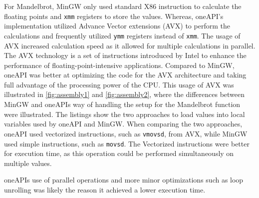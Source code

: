 For Mandelbrot, MinGW only used standard X86 instruction\cite{X86} to calculate the floating points and \texttt{xmm} registers to store the values. Whereas, oneAPI's implementation utilized Advance Vector extensions (AVX)\cite{AVXIntel} to perform the calculations and frequently utilized \texttt{ymm} registers instead of \texttt{xmm}. The usage of AVX increased calculation speed as it allowed for multiple calculations in parallel. The AVX technology is a set of instructions introduced by Intel to enhance the performance of floating-point-intensive applications\cite{AVXIntel}. Compared to MinGW, oneAPI was better at optimizing the code for the AVX architecture and taking full advantage of the processing power of the CPU. This usage of AVX was illustrated in \cref{fig:assembly1} and \cref{fig:assembly2}, where the differences between MinGW and oneAPIs way of handling the setup for the Mandelbrot function were illustrated. The listings show the two approaches to load values into local variables used by oneAPI and MinGW. When comparing the two approaches, oneAPI used vectorized instructions, such as \texttt{vmovsd}, from AVX, while MinGW used simple instructions, such as \texttt{movsd}. The Vectorized instructions were better for execution time, as this operation could be performed simultaneously on multiple values.

oneAPIs use of parallel operations and more minor optimizations such as loop unrolling was likely the reason it achieved a lower execution time.%









